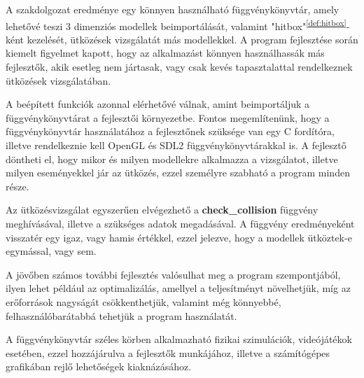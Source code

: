 
A szakdolgozat eredménye egy könnyen használható függvénykönyvtár, amely lehetővé teszi 3 dimenziós modellek beimportálását, valamint "hitbox"\textsuperscript{\ref{def:hitbox}}-ként kezelését, ütközések vizsgálatát más modellekkel. A program fejlesztése során kiemelt figyelmet kapott, hogy az alkalmazást könnyen használhassák más fejlesztők, akik esetleg nem jártasak, vagy csak kevés tapasztalattal rendelkeznek ütközések vizsgálatában.

A beépített funkciók azonnal elérhetővé válnak, amint beimportáljuk a függvénykönyvtárat a fejlesztői környezetbe. Fontos megemlítenünk, hogy a függvénykönyvtár használatához a fejlesztőnek szüksége van egy C fordítóra, illetve rendelkeznie kell OpenGL \cite{OpenGL} és SDL2 \cite{SDL2} függvénykönyvtárakkal is. A fejlesztő döntheti el, hogy mikor és milyen modellekre alkalmazza a vizsgálatot, illetve milyen eseményekkel jár az ütközés, ezzel személyre szabható a program minden része.

Az ütközésvizsgálat egyszerűen elvégezhető a \textbf{check\_collision} függvény meghívásával, illetve a szükséges adatok megadásával. A függvény eredményeként visszatér egy igaz, vagy hamis értékkel, ezzel jelezve, hogy a modellek ütköztek-e egymással, vagy sem.

A jövőben számos további fejlesztés valósulhat meg a program szempontjából, ilyen lehet például az optimalizálás, amellyel a teljesítményt növelhetjük, míg az erőforrások nagyságát csökkenthetjük, valamint még könnyebbé, felhasználóbarátabbá tehetjük a program használatát.

A függvénykönyvtár széles körben alkalmazható fizikai szimulációk, videójátékok esetében, ezzel hozzájárulva a fejlesztők munkájához, illetve a számítógépes grafikában rejlő lehetőségek kiaknázásához.
